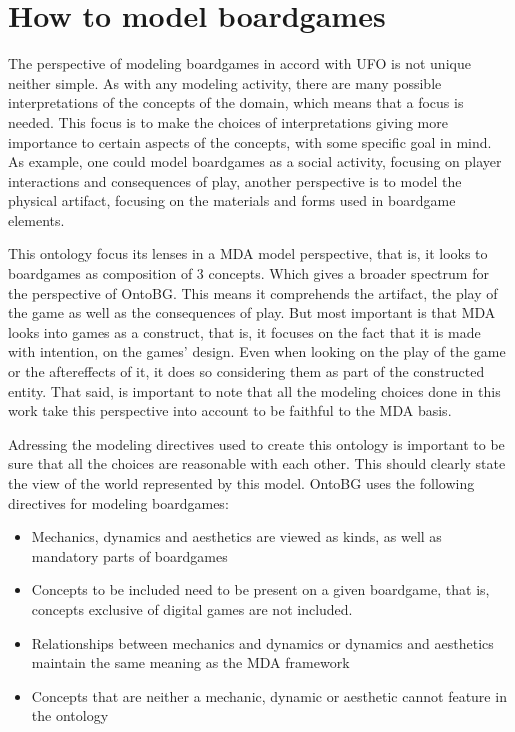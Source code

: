 \section{How to model boardgames} 

The perspective of modeling boardgames in accord with UFO is not unique neither simple. As with any modeling activity, there are many possible interpretations of the concepts of the domain, which means that a focus is needed. This focus is to make the choices of interpretations giving more importance to certain aspects of the concepts, with some specific goal in mind. As example, one could model boardgames as a social activity, focusing on player interactions and consequences of play, another perspective is to model the physical artifact, focusing on the materials and forms used in boardgame elements.

This ontology focus its lenses in a MDA model perspective, that is, it looks to boardgames as composition of 3 concepts. Which gives a broader spectrum for the perspective of OntoBG. This means it comprehends the artifact, the play of the game as well as the consequences of play. But most important is that MDA looks into games as a construct, that is, it focuses on the fact that it is made with intention, on the games' design. Even when looking on the play of the game or the aftereffects of it, it does so considering them as part of the constructed entity. That said, is important to note that all the modeling choices done in this work take this perspective into account to be faithful to the MDA basis. 

Adressing the modeling directives used to create this ontology is important to be sure that all the choices are reasonable with each other. This should clearly state the view of the world represented by this model. OntoBG uses the following directives for modeling boardgames:

\begin{itemize}
    \item Mechanics, dynamics and aesthetics are viewed as kinds, as well as mandatory parts of boardgames
    \item Concepts to be included need to be present on a given boardgame, that is, concepts exclusive of digital games are not included.
    \item Relationships between mechanics and dynamics or dynamics and aesthetics maintain the same meaning as the MDA framework
    \item Concepts that are neither a mechanic, dynamic or aesthetic cannot feature in the ontology
\end{itemize}

